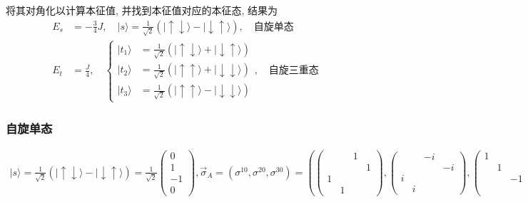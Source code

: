\documentclass[../../main.tex]{subfiles}
\begin{document}
将其对角化以计算本征值, 并找到本征值对应的本征态, 结果为
\begin{align*}
    E_{s} &= -\frac{3}{4}J,\quad |s\rangle = \frac{1}{\sqrt{2}}(|\uparrow\downarrow\rangle - |\downarrow\uparrow\rangle),\quad \text{自旋单态}\\
    E_{t} &= \frac{J}{4},\quad \left\{\begin{aligned}
        |t_{1}\rangle &= \frac{1}{\sqrt{2}}(|\uparrow\downarrow\rangle + |\downarrow\uparrow\rangle)\\
        |t_{2}\rangle &= \frac{1}{\sqrt{2}}(|\uparrow\uparrow\rangle + |\downarrow\downarrow\rangle)\\
        |t_{3}\rangle &= \frac{1}{\sqrt{2}}(|\uparrow\uparrow\rangle - |\downarrow\downarrow\rangle)
    \end{aligned}\right.,\quad \text{自旋三重态}
\end{align*}

\subsubsection{自旋单态}

\begin{align*}
    |s\rangle = \frac{1}{\sqrt{2}}(|\uparrow\downarrow\rangle - |\downarrow\uparrow\rangle) = \frac{1}{\sqrt{2}}\begin{pmatrix}
        0 \\ 1 \\ -1 \\ 0
    \end{pmatrix},\vec{\sigma}_{A} = (\sigma^{10},\sigma^{20},\sigma^{30}) = \left(\begin{pmatrix}
         &  & 1 &  \\  &  &  & 1\\ 1 &  &  &  \\  & 1 &  & 
    \end{pmatrix}, \begin{pmatrix}
         &  & -i &  \\  &  &  & -i\\ i &  &  &  \\  & i &  & 
    \end{pmatrix}, \begin{pmatrix}
        1 &  &  &  \\  & 1 &  & \\  &  & -1 &  \\  &  &  & -1
    \end{pmatrix}
    \right)
\end{align*}
\end{document}
